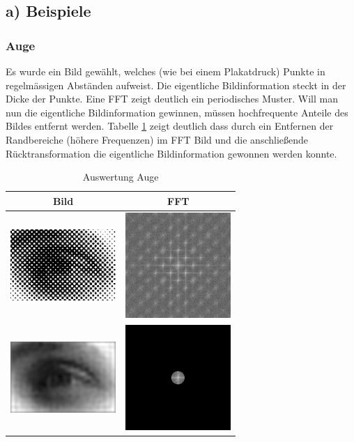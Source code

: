 \documentclass[12pt,german]{article}
\begin{document}
\subsection{a) Beispiele}

\subsubsection{Auge}
Es wurde ein Bild gewählt, welches (wie bei einem Plakatdruck) Punkte in regelmässigen Abständen aufweist. Die eigentliche Bildinformation steckt in der Dicke der Punkte. Eine FFT zeigt deutlich ein periodisches Muster. Will man nun die eigentliche Bildinformation gewinnen, müssen hochfrequente Anteile des Bildes entfernt werden. Tabelle \ref{tab:AuswertungAuge} zeigt deutlich dass durch ein Entfernen der Randbereiche (höhere Frequenzen) im FFT Bild und die anschließende Rücktransformation die eigentliche Bildinformation gewonnen werden konnte.
\begin{table}[h]
  \centering
  \begin{tabular}{c | c}
    \hline
    Bild & FFT \\
    \hline
	\includegraphics[width=4cm]{../testData/Auge.jpg} & \includegraphics[width=4cm]{../testData/Results/Auge/FFT_of_Auge.jpg} \\
    \hline
    \includegraphics[width=4cm]{../testData/Results/Auge/reduced_Auge.jpg} & \includegraphics[width=4cm]{../testData/Results/Auge/reduced_FFT_of_Auge.jpg} \\
  \end{tabular}
  \caption{Auswertung Auge}
  \label{tab:AuswertungAuge}
\end{table}
\end{document}
